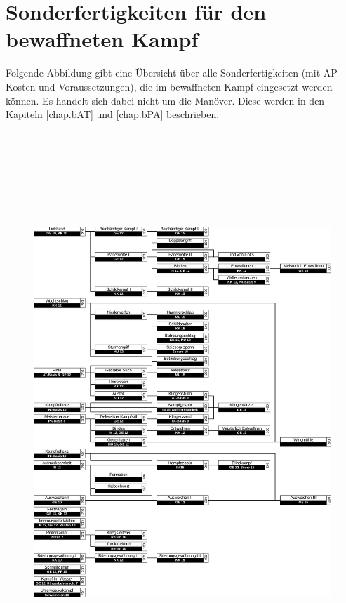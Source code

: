 %

\section{Sonderfertigkeiten für den bewaffneten Kampf}
Folgende Abbildung gibt eine Übersicht über alle Sonderfertigkeiten (mit
AP-Kosten und Voraussetzungen), die im bewaffneten Kampf eingesetzt werden
können. Es handelt sich dabei nicht um die Manöver. Diese werden in den
Kapiteln \ref{chap.bAT} und \ref{chap.bPA} beschrieben.

\begin{figure}
    \centering
    \includegraphics[width=16.986cm,height=21.179cm]{fig/allSF.pdf}
\end{figure}

